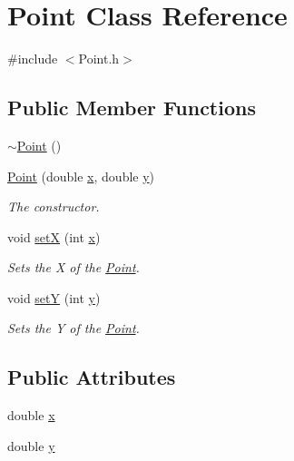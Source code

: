 \hypertarget{class_point}{}\section{Point Class Reference}
\label{class_point}


{\ttfamily \#include $<$Point.\+h$>$}

\subsection*{Public Member Functions}
\begin{DoxyCompactItemize}
\item 
\mbox{\hyperlink{class_point_a395fa04b4ec126b66fc053f829a30cc1}{$\sim$\+Point}} ()
\item 
\mbox{\hyperlink{class_point_a78b55e8d5466bb8c2cf60fa55f2562ff}{Point}} (double \mbox{\hyperlink{class_point_ab99c56589bc8ad5fa5071387110a5bc7}{x}}, double \mbox{\hyperlink{class_point_afa38be143ae800e6ad69ce8ed4df62d8}{y}})
\begin{DoxyCompactList}\small\item\em The constructor. \end{DoxyCompactList}\item 
void \mbox{\hyperlink{class_point_acdc86ab607b2ae8415152883e2629015}{setX}} (int \mbox{\hyperlink{class_point_ab99c56589bc8ad5fa5071387110a5bc7}{x}})
\begin{DoxyCompactList}\small\item\em Sets the X of the \mbox{\hyperlink{class_point}{Point}}. \end{DoxyCompactList}\item 
void \mbox{\hyperlink{class_point_afccad787a359f062efc1af5e935a99ba}{setY}} (int \mbox{\hyperlink{class_point_afa38be143ae800e6ad69ce8ed4df62d8}{y}})
\begin{DoxyCompactList}\small\item\em Sets the Y of the \mbox{\hyperlink{class_point}{Point}}. \end{DoxyCompactList}\end{DoxyCompactItemize}
\subsection*{Public Attributes}
\begin{DoxyCompactItemize}
\item 
double \mbox{\hyperlink{class_point_ab99c56589bc8ad5fa5071387110a5bc7}{x}}
\item 
double \mbox{\hyperlink{class_point_afa38be143ae800e6ad69ce8ed4df62d8}{y}}
\end{DoxyCompactItemize}


